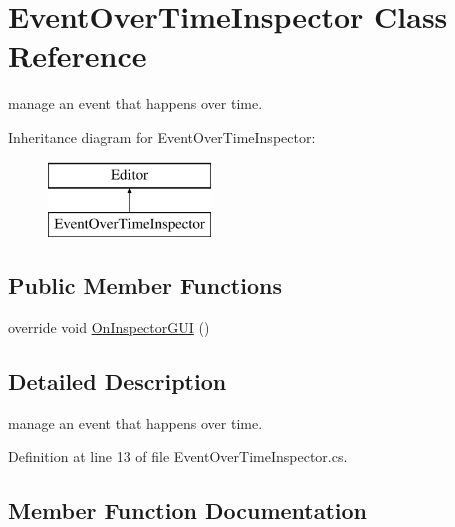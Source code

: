 \hypertarget{class_event_over_time_inspector}{}\section{Event\+Over\+Time\+Inspector Class Reference}
\label{class_event_over_time_inspector}


manage an event that happens over time.  


Inheritance diagram for Event\+Over\+Time\+Inspector\+:\begin{figure}[H]
\begin{center}
\leavevmode
\includegraphics[height=2.000000cm]{class_event_over_time_inspector}
\end{center}
\end{figure}
\subsection*{Public Member Functions}
\begin{DoxyCompactItemize}
\item 
override void \mbox{\hyperlink{class_event_over_time_inspector_a4dc8fec4c3c0658d2869b46342d504ec}{On\+Inspector\+G\+UI}} ()
\end{DoxyCompactItemize}


\subsection{Detailed Description}
manage an event that happens over time. 



Definition at line 13 of file Event\+Over\+Time\+Inspector.\+cs.



\subsection{Member Function Documentation}
\mbox{\label{class_event_over_time_inspector_a4dc8fec4c3c0658d2869b46342d504ec}} 
